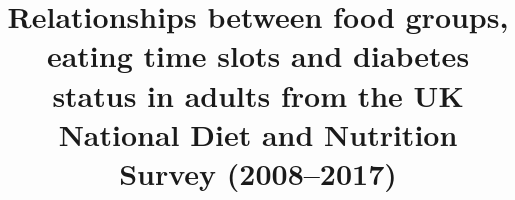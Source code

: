 \documentclass{bmcart}
\begin{document}
\begin{frontmatter}

\begin{fmbox}


\title{Relationships between food groups, eating time slots and diabetes status in
  adults from the UK National Diet and Nutrition Survey (2008--2017)}


\author[
  addressref={aff1},                   %
  email={chaochen@wangcc.me}   %
]{ }
\author[
  addressref={aff2},
  email={}
]{ }
\author[
  addressref={aff3, aff4, aff5},
  corref={aff3},
  email={Luigi.Palla@uniroma1.it}
]{ }



\end{fmbox}
\end{frontmatter}
\end{document}
